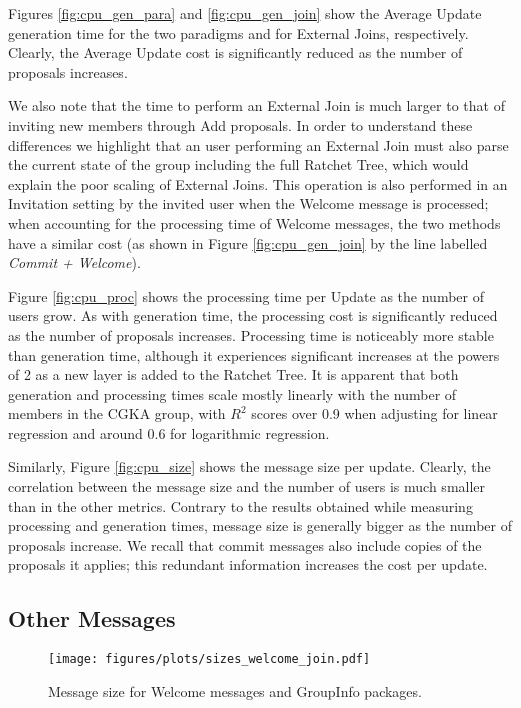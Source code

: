 \documentclass[preprint, 12pt]{elsarticle}
\begin{document}
Figures \ref{fig:cpu_gen_para} and \ref{fig:cpu_gen_join} show the Average Update generation time for the two paradigms and for External Joins, respectively. Clearly, the Average Update cost is significantly reduced as the number of proposals increases.

We also note that the time to perform an External Join is much larger to that of inviting new members through Add proposals. In order to understand these differences we highlight that an user performing an External Join must also parse the current state of the group including the full Ratchet Tree, which would explain the poor scaling of External Joins. This operation is also performed in an Invitation setting by the invited user when the Welcome message is processed; when accounting for the processing time of Welcome messages, the two methods have a similar cost (as shown in Figure \ref{fig:cpu_gen_join} by the line labelled \textit{Commit + Welcome}).

Figure \ref{fig:cpu_proc} shows the processing time per Update as the number of users grow. As with generation time, the processing cost is significantly reduced as the number of proposals increases. Processing time is noticeably more stable than generation time, although it experiences significant increases at the powers of 2 as a new layer is added to the Ratchet Tree. It is apparent that both generation and processing times scale mostly linearly with the number of members in the CGKA group, with $R^2$ scores over 0.9 when adjusting for linear regression and around 0.6 for logarithmic regression.

Similarly, Figure \ref{fig:cpu_size} shows the message size per update. Clearly, the correlation between the message size and the number of users is much smaller than in the other metrics. Contrary to the results obtained while measuring processing and generation times, message size is generally bigger as the number of proposals increase. We recall that commit messages also include copies of the proposals it applies; this redundant information increases the cost per update.

\subsection{Other Messages}

\begin{figure}
\centering
\texttt{[image: figures/plots/sizes\_welcome\_join.pdf]}
\caption{Message size for Welcome messages and GroupInfo packages.}
\label{fig:size_wel}
\end{figure}
\end{document}
